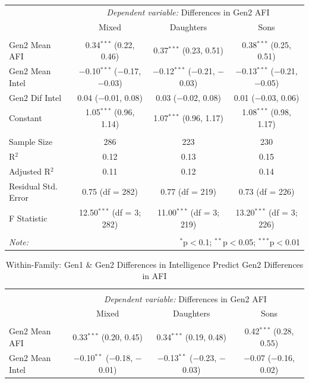 \documentclass[a4paper,man,apacite,natbib,12pt,longtable]{apa6}\usepackage[]{graphicx}\usepackage[]{color}
\begin{document}
\begin{landscape}
\begin{longtable}{@{\extracolsep{5pt}}lccc}
  & \multicolumn{3}{c}{\textit{Dependent variable:} Differences in Gen2 AFI} \\ 
  \cline{2-4}
   & Mixed & Daughters & Sons \\ 
\hline \\[-1.8ex] 
 Gen2 Mean AFI & 0.34$^{***}$ (0.22, 0.46) & 0.37$^{***}$ (0.23, 0.51) & 0.38$^{***}$ (0.25, 0.51) \\ 
  Gen2 Mean Intel & $-$0.10$^{***}$ ($-$0.17, $-$0.03) & $-$0.12$^{***}$ ($-$0.21, $-$0.03) & $-$0.13$^{***}$ ($-$0.21, $-$0.05) \\ 
  Gen2 Dif Intel & 0.04 ($-$0.01, 0.08) & 0.03 ($-$0.02, 0.08) & 0.01 ($-$0.03, 0.06) \\ 
  Constant & 1.05$^{***}$ (0.96, 1.14) & 1.07$^{***}$ (0.96, 1.17) & 1.08$^{***}$ (0.98, 1.17) \\ 
 \hline \\[-1.8ex] 
Sample Size & 286 & 223 & 230 \\ 
R$^{2}$ & 0.12 & 0.13 & 0.15 \\ 
Adjusted R$^{2}$ & 0.11 & 0.12 & 0.14 \\ 
Residual Std. Error & 0.75 (df = 282) & 0.77 (df = 219) & 0.73 (df = 226) \\ 
F Statistic & 12.50$^{***}$ (df = 3; 282) & 11.00$^{***}$ (df = 3; 219) & 13.20$^{***}$ (df = 3; 226) \\ 
\hline 
\hline \\[-1.8ex] 
\textit{Note:}  & \multicolumn{3}{r}{$^{*}$p$<$0.1; $^{**}$p$<$0.05; $^{***}$p$<$0.01} \\ 
  \end{longtable}\pagebreak
  \begin{longtable}{@{\extracolsep{5pt}}lccc} 
  \caption{Within-Family: Gen1 \& Gen2 Differences in Intelligence Predict Gen2 Differences in AFI} \label{table_Dif_Joint_Intelligence_Dif_Child_AFI_11}
  \\[-1.8ex]\hline 
  \hline \\[-3.8ex] 
  & \multicolumn{3}{c}{\textit{Dependent variable:} Differences in Gen2 AFI} \\ 
  \cline{2-4}
   & Mixed & Daughters & Sons \\ 
\hline \\[-1.8ex] 
 Gen2 Mean AFI & 0.33$^{***}$ (0.20, 0.45) & 0.34$^{***}$ (0.19, 0.48) & 0.42$^{***}$ (0.28, 0.55) \\ 
  Gen2 Mean Intel & $-$0.10$^{**}$ ($-$0.18, $-$0.01) & $-$0.13$^{**}$ ($-$0.23, $-$0.03) & $-$0.07 ($-$0.16, 0.02) \\ 

\end{longtable}
\end{landscape}
\end{document}
